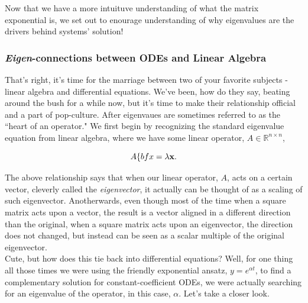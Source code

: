 Now that we have a more intuituve understanding of what the matrix exponential is, we set out to enourage understanding of why eigenvalues are the drivers behind systems' solution!


%
%
%
%
\subsubsection{\emph{Eigen}-connections between ODEs and Linear Algebra}

That's right, it's time for the marriage between two of your favorite subjects - linear algebra and differential equations. We've been, how do they say, beating around the bush for a while now, but it's time to make their relationship official and a part of pop-culture. After eigenvaues are sometimes referred to as the ``heart of an operator." We first begin by recognizing the standard eigenvalue equation from linear algebra, where we have some linear operator, $A\in\mathbb{R}^{n\times n}$, 

$$A{\{bf{x}} = \lambda {\bf{x}}.$$

The above relationship says that when our linear operator, $A$, acts on a certain vector, cleverly called the \emph{eigenvector}, it actually can be thought of as a scaling of such eigenvector. Anotherwards, even though most of the time when a square matrix acts upon a vector, the result is a vector aligned in a different direction than the original, when a square matrix acts upon an eigenvector, the direction does not changed, but instead can be seen as a scalar multiple of the original eigenvector. \\

Cute, but how does this tie back into differential equations? Well, for one thing all those times we were using the friendly exponential ansatz, $y=e^{\alpha t}$, to find a complementary solution for constant-coefficient ODEs, we were actually searching for an eigenvalue of the operator, in this case, $\alpha$. Let's take a closer look. \\

